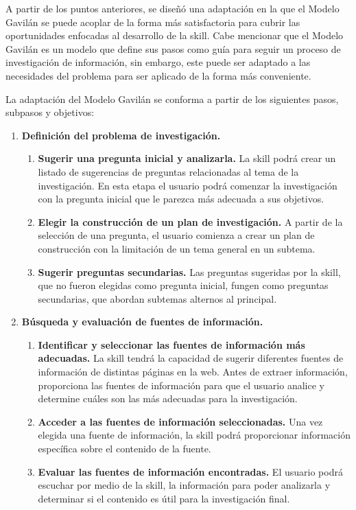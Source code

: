 A partir de los puntos anteriores, se diseñó una adaptación en la que el Modelo Gavilán se puede acoplar de la forma más satisfactoria para cubrir las oportunidades enfocadas al desarrollo de la skill. Cabe mencionar que el Modelo Gavilán es un modelo que define sus pasos como guía para seguir un proceso de investigación de información, sin embargo, este puede ser adaptado a las necesidades del problema para ser aplicado de la forma más conveniente.

La adaptación del Modelo Gavilán se conforma a partir de los siguientes pasos, subpasos y objetivos:

\begin{enumerate}
  \item \textbf{Definición del problema de investigación.}
  \begin{enumerate}[1.]
    \item \textbf{Sugerir una pregunta inicial y analizarla.} La skill podrá crear un listado de sugerencias de preguntas relacionadas al tema de la investigación. En esta etapa el usuario podrá comenzar la investigación con la pregunta inicial que le parezca más adecuada a sus objetivos.
    \item \textbf{Elegir la construcción de un plan de investigación.} A partir de la selección de una pregunta, el usuario comienza a crear un plan de construcción con la limitación de un tema general en un subtema.
    \item \textbf{Sugerir preguntas secundarias.} Las preguntas sugeridas por la skill, que no fueron elegidas como pregunta inicial, fungen como preguntas secundarias, que abordan subtemas alternos al principal.
  \end{enumerate}
  \item \textbf{Búsqueda y evaluación de fuentes de información.}
  \begin{enumerate}[1.]
    \item \textbf{Identificar y seleccionar las fuentes de información más adecuadas.} La skill tendrá la capacidad de sugerir diferentes fuentes de información de distintas páginas en la web. Antes de extraer información, proporciona las fuentes de información para que el usuario analice y determine cuáles son las más adecuadas para la investigación.
    \item \textbf{Acceder a las fuentes de información seleccionadas.} Una vez elegida una fuente de información, la skill podrá proporcionar información específica sobre el contenido de la fuente.
    \item \textbf{Evaluar las fuentes de información encontradas.} El usuario podrá escuchar por medio de la skill, la información para poder analizarla y determinar si el contenido es útil para la investigación final.

\end{enumerate}
\end{enumerate}

